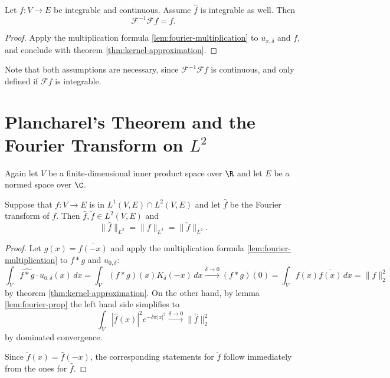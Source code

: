 \begin{theorem}
  \label{thm:fourier-inversion}
  Let $f:V\to E$ be integrable and continuous. Assume $\widehat f$ is integrable as well. Then
  $$\mathcal F^{-1}\mathcal F f=f.$$
  \leanok
\end{theorem}
\begin{proof}
\leanok
Apply the multiplication formula \ref{lem:fourier-multiplication} to $u_{x,\delta}$ and $f$, and conclude with
theorem \ref{thm:kernel-approximation}.
\end{proof}

\begin{remark}
  Note that both assumptions are necessary, since $\mathcal F^{-1}\mathcal Ff$ is continuous, and
  only defined if $\mathcal Ff$ is integrable.
\end{remark}

\section{\texorpdfstring{Plancharel's Theorem and the Fourier Transform on $L^2$}
                        {Plancharel's Theorem and the Fourier Transform on L2}}
Again let $V$ be a finite-dimensional inner product space over $\R$ and let $E$ be a normed space over $\C$.
\begin{theorem}
  \label{thm:plancherel}
  \leanok %
   Suppose that $f : V \to E$ is in $L^1(V,E)\cap L^2(V,E)$ and let $\widehat{f}$ be the Fourier transform of $f$. Then $\widehat{f},\check{f}\in L^2(V,E)$ and
  \[\|\widehat{f}\|_{L^2} = \|f\|_{L^2}=\|\check f\|_{L^2}.\]
  \end{theorem}
    \begin{proof}
    Let $g(x)=\overline{f(-x)}$ and apply the multiplication formula \ref{lem:fourier-multiplication}
    to $f\ast g$ and $u_{0,\delta}$: $$\int_V\widehat{f\ast g}\cdot u_{0,\delta}(x)\,dx=\int_V(f\ast g)(x)K_\delta(-x)\,dx
    \overset{\delta\to0}\to(f\ast g)(0)=\int_Vf(x)\overline{f(x)}\,dx=\| f\|_2^2$$ by theorem \ref{thm:kernel-approximation}.
    On the other hand, by lemma \ref{lem:fourier-prop} the left hand side simplifies to
    $$\int_V|\widehat f(x)|^2e^{-\delta\pi|x|^2}\xrightarrow{\delta\to0}\|\widehat f\|_2^2$$ by dominated convergence.

    Since $\check f(x)=\widehat f(-x)$, the corresponding statements for $\check f$ follow immediately from the ones for $\widehat f$.
\end{proof}

